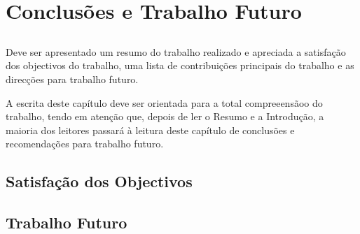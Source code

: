 \chapter{Conclusões e Trabalho Futuro} \label{chap:concl}

\section*{}

Deve ser apresentado um resumo do trabalho realizado e apreciada a
satisfação dos objectivos do trabalho, uma lista de contribuições
principais do trabalho e as direcções para trabalho futuro.

A escrita deste capítulo deve ser orientada para a total compreeensãoo
do trabalho, tendo em atenção que, depois de ler o Resumo e a
Introdução, a maioria dos leitores passará à leitura deste capítulo de
conclusões e recomendações para trabalho futuro.

\section{Satisfação dos Objectivos}

 

\section{Trabalho Futuro}





